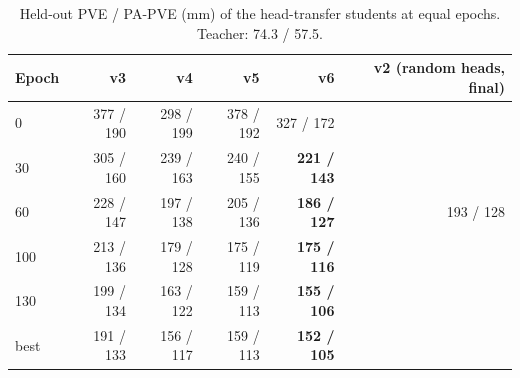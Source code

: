 
\begin{table}[h]
\centering\small
\begin{tabular}{lrrrrr}
\toprule
Epoch & v3 & v4 & v5 & v6 & v2 (random heads, final) \\
\midrule
0   & 377 / 190 & 298 / 199 & 378 / 192 & 327 / 172 & \\
30  & 305 / 160 & 239 / 163 & 240 / 155 & \textbf{221 / 143} & \\
60  & 228 / 147 & 197 / 138 & 205 / 136 & \textbf{186 / 127} & 193 / 128 \\
100 & 213 / 136 & 179 / 128 & 175 / 119 & \textbf{175 / 116} & \\
130 & 199 / 134 & 163 / 122 & 159 / 113 & \textbf{155 / 106} & \\
best & 191 / 133 & 156 / 117 & 159 / 113 & \textbf{152 / 105} & \\
\bottomrule
\end{tabular}
\caption{Held-out PVE / PA-PVE (mm) of the head-transfer students at equal
epochs. Teacher: 74.3 / 57.5.}
\label{tab:kd_epochs}
\end{table}
